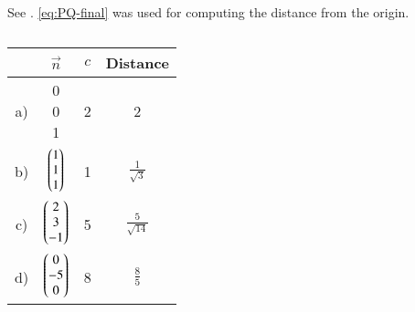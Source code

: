   See 
  .
			\eqref{eq:PQ-final} was used for computing the distance from the origin.
			\begin{table}[!htbp]
  \centering
  \begin{tabular}{|c|c|c|c|}
    \hline
    & $\vec{n}$ & $c$ & Distance \\
    \hline
    a) &		\myvec{0\\0\\1}  &2  & 2 \\
    \hline
    b) & $\begin{pmatrix}1\\1\\1\end{pmatrix}$ & 1 & $\frac{1}{\sqrt{3}}$ \\
    \hline
    c) & $\begin{pmatrix}2\\3\\-1\end{pmatrix}$ & 5 & $\frac{5}{\sqrt{14}}$ \\
    \hline
    d) & $\begin{pmatrix}0\\-5\\0\end{pmatrix}$ & 8 & $\frac{8}{5}$ \\
    \hline
  \end{tabular}
  \caption{}
  \label{tab:12/11/3/1}
\end{table}
 


